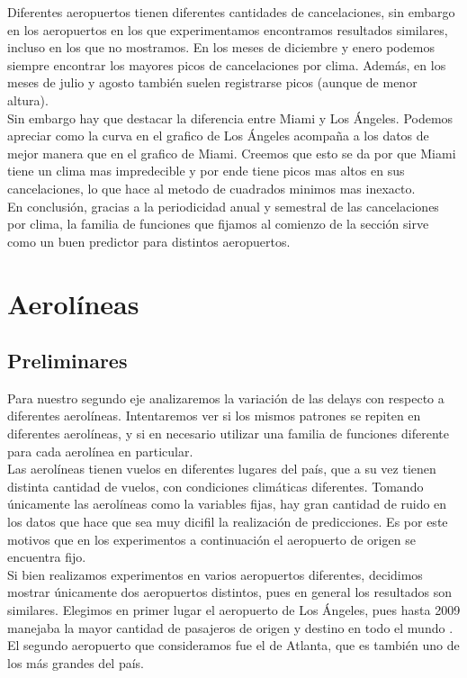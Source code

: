 Diferentes aeropuertos tienen diferentes cantidades de cancelaciones, sin embargo en los aeropuertos en los que experimentamos encontramos resultados similares, incluso en los que no mostramos. En los meses de diciembre y enero podemos siempre encontrar los mayores picos de cancelaciones por clima. Además, en los meses de julio y agosto también suelen registrarse picos (aunque de menor altura). \\

Sin embargo hay que destacar la diferencia entre Miami y Los Ángeles. Podemos apreciar como la curva en el grafico de Los Ángeles acompaña a los datos de mejor manera que en el grafico de Miami. Creemos que esto se da por que Miami tiene un clima mas impredecible y por ende tiene picos mas altos en sus cancelaciones, lo que hace al metodo de cuadrados minimos mas inexacto.\\

En conclusión, gracias a la periodicidad anual y semestral de las cancelaciones por clima, la familia de funciones que fijamos al comienzo de la sección sirve como un buen predictor para distintos aeropuertos. \\

\section{Aerolíneas}

\subsection{Preliminares}
Para nuestro segundo eje analizaremos la variación de las delays con respecto a diferentes aerolíneas. Intentaremos ver si los mismos patrones se repiten en diferentes aerolíneas, y si en necesario utilizar una familia de funciones diferente para cada aerolínea en particular. \\

Las aerolíneas tienen vuelos en diferentes lugares del país, que a su vez tienen distinta cantidad de vuelos, con condiciones climáticas diferentes. Tomando únicamente las aerolíneas como la variables fijas, hay gran cantidad de ruido en los datos que hace que sea muy dicifil la realización de predicciones. Es por este motivos que en los experimentos a continuación el aeropuerto de origen se encuentra fijo. \\

Si bien realizamos experimentos en varios aeropuertos diferentes, decidimos mostrar únicamente dos aeropuertos distintos, pues en general los resultados son similares. Elegimos en primer lugar el aeropuerto de Los Ángeles, pues hasta 2009 manejaba la mayor cantidad de pasajeros de origen y destino en todo el mundo \cite{LosAngelesAeropuerto}. El segundo aeropuerto que consideramos fue el de Atlanta, que es también uno de los más grandes del país. \\

